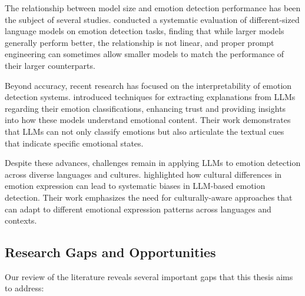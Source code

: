 \documentclass[a4paper,12pt]{extarticle}
\begin{document}
The relationship between model size and emotion detection performance has been the subject of several studies. \cite{zhao2023survey} conducted a systematic evaluation of different-sized language models on emotion detection tasks, finding that while larger models generally perform better, the relationship is not linear, and proper prompt engineering can sometimes allow smaller models to match the performance of their larger counterparts.

Beyond accuracy, recent research has focused on the interpretability of emotion detection systems. \cite{park2022social} introduced techniques for extracting explanations from LLMs regarding their emotion classifications, enhancing trust and providing insights into how these models understand emotional content. Their work demonstrates that LLMs can not only classify emotions but also articulate the textual cues that indicate specific emotional states.

Despite these advances, challenges remain in applying LLMs to emotion detection across diverse languages and cultures. \cite{derczynski2022cultural} highlighted how cultural differences in emotion expression can lead to systematic biases in LLM-based emotion detection. Their work emphasizes the need for culturally-aware approaches that can adapt to different emotional expression patterns across languages and contexts.

\subsection{Research Gaps and Opportunities}

Our review of the literature reveals several important gaps that this thesis aims to address:
\end{document}
